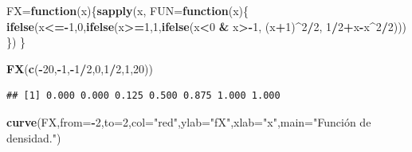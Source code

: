 \documentclass[
]{article}
\newenvironment{Shaded}{\begin{snugshade}}{\end{snugshade}}
\newcommand{\AttributeTok}[1]{\textcolor[rgb]{0.13,0.29,0.53}{#1}}
\newcommand{\ControlFlowTok}[1]{\textcolor[rgb]{0.13,0.29,0.53}{\textbf{#1}}}
\newcommand{\DecValTok}[1]{\textcolor[rgb]{0.00,0.00,0.81}{#1}}
\newcommand{\FunctionTok}[1]{\textcolor[rgb]{0.13,0.29,0.53}{\textbf{#1}}}
\newcommand{\NormalTok}[1]{#1}
\newcommand{\OtherTok}[1]{\textcolor[rgb]{0.56,0.35,0.01}{#1}}
\newcommand{\SpecialCharTok}[1]{\textcolor[rgb]{0.81,0.36,0.00}{\textbf{#1}}}
\newcommand{\StringTok}[1]{\textcolor[rgb]{0.31,0.60,0.02}{#1}}
\begin{document}
\begin{Shaded}
\begin{Highlighting}[]
\NormalTok{FX}\OtherTok{=}\ControlFlowTok{function}\NormalTok{(x)\{}\FunctionTok{sapply}\NormalTok{(x,}
                      \AttributeTok{FUN=}\ControlFlowTok{function}\NormalTok{(x)\{}
\FunctionTok{ifelse}\NormalTok{(x}\SpecialCharTok{\textless{}={-}}\DecValTok{1}\NormalTok{,}\DecValTok{0}\NormalTok{,}\FunctionTok{ifelse}\NormalTok{(x}\SpecialCharTok{\textgreater{}=}\DecValTok{1}\NormalTok{,}\DecValTok{1}\NormalTok{,}\FunctionTok{ifelse}\NormalTok{(x}\SpecialCharTok{\textless{}}\DecValTok{0} \SpecialCharTok{\&}\NormalTok{ x}\SpecialCharTok{\textgreater{}{-}}\DecValTok{1}\NormalTok{, (x}\SpecialCharTok{+}\DecValTok{1}\NormalTok{)}\SpecialCharTok{\^{}}\DecValTok{2}\SpecialCharTok{/}\DecValTok{2}\NormalTok{, }\DecValTok{1}\SpecialCharTok{/}\DecValTok{2}\SpecialCharTok{+}\NormalTok{x}\SpecialCharTok{{-}}\NormalTok{x}\SpecialCharTok{\^{}}\DecValTok{2}\SpecialCharTok{/}\DecValTok{2}\NormalTok{)))  }
\NormalTok{\})}
\NormalTok{\}}

                            
                          
\FunctionTok{FX}\NormalTok{(}\FunctionTok{c}\NormalTok{(}\SpecialCharTok{{-}}\DecValTok{20}\NormalTok{,}\SpecialCharTok{{-}}\DecValTok{1}\NormalTok{,}\SpecialCharTok{{-}}\DecValTok{1}\SpecialCharTok{/}\DecValTok{2}\NormalTok{,}\DecValTok{0}\NormalTok{,}\DecValTok{1}\SpecialCharTok{/}\DecValTok{2}\NormalTok{,}\DecValTok{1}\NormalTok{,}\DecValTok{20}\NormalTok{))}
\end{Highlighting}
\end{Shaded}

\begin{verbatim}
## [1] 0.000 0.000 0.125 0.500 0.875 1.000 1.000
\end{verbatim}

\begin{Shaded}
\begin{Highlighting}[]
\FunctionTok{curve}\NormalTok{(FX,}\AttributeTok{from=}\SpecialCharTok{{-}}\DecValTok{2}\NormalTok{,}\AttributeTok{to=}\DecValTok{2}\NormalTok{,}\AttributeTok{col=}\StringTok{"red"}\NormalTok{,}\AttributeTok{ylab=}\StringTok{"fX"}\NormalTok{,}\AttributeTok{xlab=}\StringTok{"x"}\NormalTok{,}\AttributeTok{main=}\StringTok{"Función de densidad."}\NormalTok{)}
\end{Highlighting}
\end{Shaded}
\end{document}
